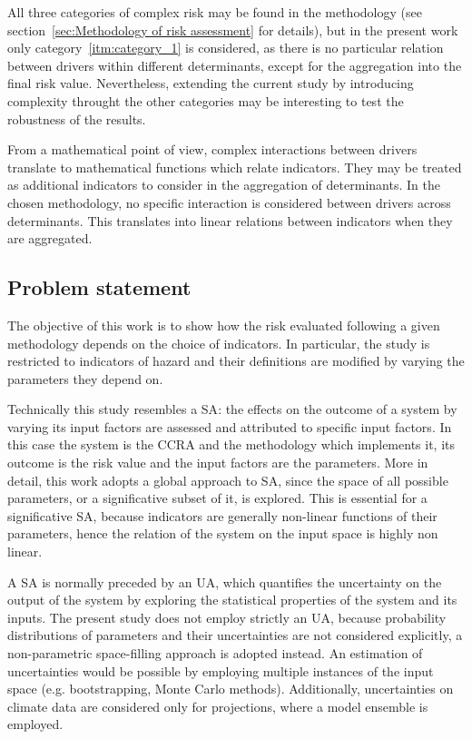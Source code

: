 All three categories of complex \gls{risk} may be found in the methodology (see section~\ref{sec:Methodology of risk assessment} for details), but in the present work only category~\ref{itm:category_1} is considered, as there is no particular relation between \glspl{driver} within different \glspl{determinant}, except for the aggregation into the final \gls{risk} value.
Nevertheless, extending the current study by introducing complexity throught the other categories may be interesting to test the robustness of the results.

From a mathematical point of view, complex interactions between \glspl{driver} translate to mathematical functions which relate \glspl{indicator}. They may be treated as additional \glspl{indicator} to consider in the aggregation of \glspl{determinant}.\cite[39-40]{2008OECDHandbookOn}
In the chosen methodology, no specific interaction is considered between drivers across determinants. This translates into linear relations between indicators when they are aggregated.



\subsection{Problem statement}
The objective of this work is to show how the \gls{risk} evaluated following a given methodology depends on the choice of \glspl{indicator}. In particular, the study is restricted to indicators of \gls{hazard} and their definitions are modified by varying the parameters they depend on.

Technically this study resembles a \gls{SA}: the effects on the outcome of a system by varying its input factors are assessed and attributed to specific input factors.\cite[627-632]{2015DeanHandbookOf} In this case the system is the \gls{CCRA} and the methodology which implements it, its outcome is the \gls{risk} value and the input factors are the parameters.
More in detail, this work adopts a global approach to \gls{SA}, since the space of all possible parameters, or a significative subset of it, is explored. This is essential for a significative \gls{SA}, because \glspl{indicator} are generally non-linear functions of their parameters, hence the relation of the system on the input space is highly non linear.\cite[31-32]{2019SaltelliWhySo}

A \gls{SA} is normally preceded by an \gls{UA}, which quantifies the uncertainty on the output of the system by exploring the statistical properties of the system and its inputs.\cite[29-30]{2019SaltelliWhySo} The present study does not employ strictly an \gls{UA}, because probability distributions of parameters and their uncertainties are not considered explicitly, a non-parametric space-filling approach is adopted instead.
An estimation of uncertainties would be possible by employing multiple instances of the input space (e.g. bootstrapping, Monte Carlo methods). Additionally, uncertainties on climate data are considered only for projections, where a model ensemble is employed.

